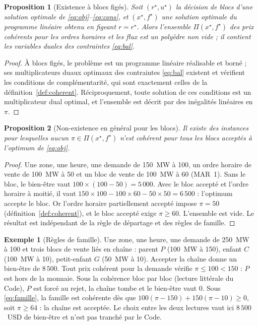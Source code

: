 \documentclass[a4paper,12pt]{article}
\newtheorem{proposition}{Proposition}
\theoremstyle{definition}
\newtheorem{example}{Exemple}
\begin{document}
\begin{proposition}[Existence à blocs figés]\label{prop:existence}
Soit $(r^\star,u^\star)$ la décision de blocs d'une solution optimale de \eqref{eq:obj}--\eqref{eq:cons}, et $(x^\star,f^\star)$ une solution optimale du programme linéaire obtenu en figeant $r=r^\star$. Alors l'ensemble $\Pi(x^\star,f^\star)$ des prix cohérents pour les ordres horaires et les flux est un polyèdre non vide ; il contient les variables duales des contraintes \eqref{eq:bal}.
\end{proposition}
\begin{proof}
À blocs figés, le problème est un programme linéaire réalisable et borné ; ses multiplicateurs duaux optimaux des contraintes \eqref{eq:bal} existent et vérifient les conditions de complémentarité, qui sont exactement celles de la définition~\ref{def:coherent}. Réciproquement, toute solution de ces conditions est un multiplicateur dual optimal, et l'ensemble est décrit par des inégalités linéaires en $\pi$.
\end{proof}

\begin{proposition}[Non-existence en général pour les blocs]\label{prop:blocs}
Il existe des instances pour lesquelles aucun $\pi\in\Pi(x^\star,f^\star)$ n'est cohérent pour tous les blocs acceptés à l'optimum de \eqref{eq:obj}.
\end{proposition}
\begin{proof}
Une zone, une heure, une demande de 150~MW à 100, un ordre horaire de vente de 100~MW à 50 et un bloc de vente de 100~MW à 60 (MAR~1). Sans le bloc, le bien-être vaut $100\times(100-50)=5\,000$. Avec le bloc accepté et l'ordre horaire à moitié, il vaut $150\times100-100\times60-50\times50=6\,500$ : l'optimum accepte le bloc. Or l'ordre horaire partiellement accepté impose $\pi=50$ (définition~\ref{def:coherent}), et le bloc accepté exige $\pi\ge60$. L'ensemble est vide. Le résultat est indépendant de la règle de départage et des règles de famille.
\end{proof}

\begin{example}[Règles de famille]\label{ex:famille}
Une zone, une heure, une demande de 250~MW à 100 et trois blocs de vente liés en chaîne : parent $P$ (100~MW à 150), enfant $C$ (100~MW à 10), petit-enfant $G$ (50~MW à 10). Accepter la chaîne donne un bien-être de $8\,500$. Tout prix cohérent pour la demande vérifie $\pi\le100<150$ : $P$ est hors de la monnaie. Sous la cohérence bloc par bloc (lecture littérale du Code), $P$ est forcé au rejet, la chaîne tombe et le bien-être vaut $0$. Sous \eqref{eq:famille}, la famille est cohérente dès que $100(\pi-150)+150(\pi-10)\ge0$, soit $\pi\ge64$ : la chaîne est acceptée. Le choix entre les deux lectures vaut ici $8\,500$~USD de bien-être et n'est pas tranché par le Code.
\end{example}
\end{document}
